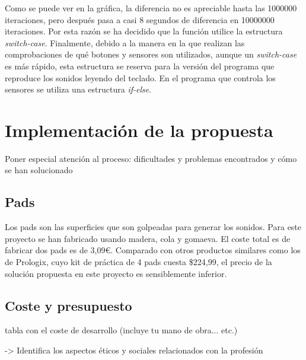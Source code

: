 \documentclass{article}
\begin{document}
    Como se puede ver en la gráfica, la diferencia no es apreciable hasta las 1000000 iteraciones, pero después
    pasa a casi 8 segundos de diferencia en 10000000 iteraciones. Por esta razón se ha decidido que la función
    utilice la estructura \textit{switch-case}.\newline
    Finalmente, debido a la manera en la que realizan las comprobaciones de qué botones y sensores son utilizados,
    aunque un \textit{switch-case} es más rápido, esta estructura se reserva para la versión del programa que
    reproduce los sonidos leyendo del teclado. En el programa que controla los sensores se utiliza una estructura
    \textit{if-else}.


\section{Implementación de la propuesta}\label{sec:Implementacion}

 Poner especial atención al proceso: dificultades y problemas encontrados y cómo se han solucionado

 \subsection{Pads}
 Los pads son las superficies que son golpeadas para generar los sonidos. Para este proyecto se han fabricado
 usando madera, cola y gomaeva\cite{GomaEva}. El coste total es de fabricar dos pads es de 3,09\euro{}. Comparado con
 otros productos similares como los de Prologix\cite{practice_pad}, cuyo kit de práctica de 4 pads cuesta
 \$224,99, el precio de la solución propuesta en este proyecto es sensiblemente inferior.

 \subsection{Coste y presupuesto}

  tabla con el coste de desarrollo (incluye tu mano de obra... etc.)

->  Identifica los aspectos éticos y sociales relacionados con la profesión

\end{document}
